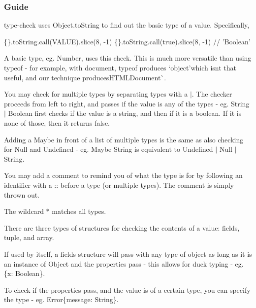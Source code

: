 \subsubsection*{Guide}

{\ttfamily type-\/check} uses {\ttfamily Object.\+to\+String} to find out the basic type of a value. Specifically,


\begin{DoxyCode}
\{\}.toString.call(VALUE).slice(8, -1)
\{\}.toString.call(true).slice(8, -1) // 'Boolean'
\end{DoxyCode}
 A basic type, eg. {\ttfamily Number}, uses this check. This is much more versatile than using {\ttfamily typeof} -\/ for example, with {\ttfamily document}, {\ttfamily typeof} produces `\textquotesingle{}object'{\ttfamily which isn\textquotesingle{}t that useful, and our technique produces}\textquotesingle{}H\+T\+M\+L\+Document\textquotesingle{}\`{}.

You may check for multiple types by separating types with a {\ttfamily $\vert$}. The checker proceeds from left to right, and passes if the value is any of the types -\/ eg. {\ttfamily String $\vert$ Boolean} first checks if the value is a string, and then if it is a boolean. If it is none of those, then it returns false.

Adding a {\ttfamily Maybe} in front of a list of multiple types is the same as also checking for {\ttfamily Null} and {\ttfamily Undefined} -\/ eg. {\ttfamily Maybe String} is equivalent to {\ttfamily Undefined $\vert$ Null $\vert$ String}.

You may add a comment to remind you of what the type is for by following an identifier with a {\ttfamily \+:\+:} before a type (or multiple types). The comment is simply thrown out.

The wildcard {\ttfamily $\ast$} matches all types.

There are three types of structures for checking the contents of a value\+: \textquotesingle{}fields\textquotesingle{}, \textquotesingle{}tuple\textquotesingle{}, and \textquotesingle{}array\textquotesingle{}.

If used by itself, a \textquotesingle{}fields\textquotesingle{} structure will pass with any type of object as long as it is an instance of {\ttfamily Object} and the properties pass -\/ this allows for duck typing -\/ eg. {\ttfamily \{x\+: Boolean\}}.

To check if the properties pass, and the value is of a certain type, you can specify the type -\/ eg. {\ttfamily Error\{message\+: String\}}.

